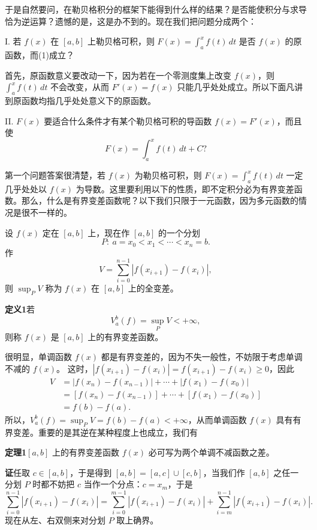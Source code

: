 于是自然要问，在勒贝格积分的框架下能得到什么样的结果？是否能使积分与求导恰为逆运算？遗憾的是，这是办不到的。现在我们把问题分成两个：

I. 若 $f(x)$ 在 $[a,b]$ 上勒贝格可积，则 $F(x)=\int_a^x f(t)\,dt$ 是否 $f(x)$ 的原函数，而(1)成立？

首先，原函数意义要改动一下，因为若在一个零测度集上改变 $f(x)$，则 $\int_a^x f(t)\,dt$ 不会改变，从而 $F'(x)=f(x)$ 只能几乎处处成立。所以下面凡讲到原函数均指几乎处处意义下的原函数。

II. $F(x)$ 要适合什么条件才有某个勒贝格可积的导函数 $f(x)=F'(x)$，而且使
\[
 F(x)=\int_a^x f(t)\,dt+C?
\]

第一个问题答案很清楚，若 $f(x)$ 为勒贝格可积，则 $F(x)=\int_a^x f(t)\,dt$ 一定几乎处处以 $f(x)$ 为导数。这里要利用以下的性质，即不定积分必为有界变差函数。那么，什么是有界变差函数呢？以下我们只限于一元函数，因为多元函数的情况是很不一样的。

设 $f(x)$ 定在 $[a,b]$ 上，现在作 $[a,b]$ 的一个分划
\[
 P:\ a=x_0<x_1<\cdots<x_n=b.
\]
作
\[
 V=\sum_{i=0}^{n-1}|f(x_{i+1})-f(x_i)|,
\]
则 $\sup_PV$ 称为 $f(x)$ 在 $[a,b]$ 上的全变差。

\noindent\textbf{定义1}\quad 若
\[
 V_a^b(f)=\sup_PV<+\infty,
\]
则称 $f(x)$ 是 $[a,b]$ 上的有界变差函数。

很明显，单调函数 $f(x)$ 都是有界变差的，因为不失一般性，不妨限于考虑单调不减的 $f(x)$。
这时，$|f(x_{i+1})-f(x_i)|=f(x_{i+1})-f(x_i)\ge0$，因此
\[
\begin{aligned}
V&=|f(x_n)-f(x_{n-1})|+\cdots+|f(x_1)-f(x_0)|\\
 &= [f(x_n)-f(x_{n-1})]+\cdots+[f(x_1)-f(x_0)]\\
 &=f(b)-f(a).
\end{aligned}
\]
所以，$V_a^b(f)=\sup_PV=f(b)-f(a)<+\infty$，从而单调函数 $f(x)$ 具有有界变差。重要的是其逆在某种程度上也成立，我们有

\noindent\textbf{定理1}\quad $[a,b]$ 上的有界变差函数 $f(x)$ 必可写为两个单调不减函数之差。

\noindent\textbf{证}\quad 任取 $c\in[a,b]$，于是得到 $[a,b]=[a,c]\cup[c,b]$，当我们作 $[a,b]$ 之任一分划 $P$ 时都不妨把 $c$ 当作一个分点：$c=x_m$，于是
\begin{equation}
 \sum_{i=0}^{n-1}|f(x_{i+1})-f(x_i)|
 =\sum_{i=0}^{m-1}|f(x_{i+1})-f(x_i)|
 +\sum_{i=m}^{n-1}|f(x_{i+1})-f(x_i)|.
 \tag{2}
\end{equation}
现在从左、右双侧来对分划 $P$ 取上确界。

